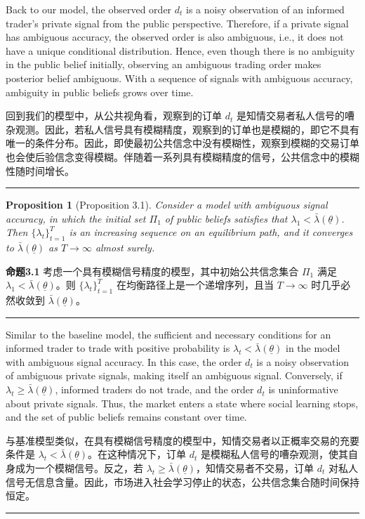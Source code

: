 \documentclass[12pt,a4paper]{article}
\newenvironment{original}{%
  \par\vspace{4pt}\noindent%
  \color{black}%
  \ignorespaces
}{%
  \par\vspace{2pt}%
}
\newenvironment{translation}{%
  \par\vspace{2pt}\noindent%
  \color{transblue}%
  \ignorespaces
}{%
  \par\vspace{4pt}\hrule\vspace{6pt}%
}
\newtheorem{proposition}[theorem]{Proposition}
\begin{document}
\begin{original}
Back to our model, the observed order $d_t$ is a noisy observation of an informed trader's private signal from the public perspective. Therefore, if a private signal has ambiguous accuracy, the observed order is also ambiguous, i.e., it does not have a unique conditional distribution. Hence, even though there is no ambiguity in the public belief initially, observing an ambiguous trading order makes posterior belief ambiguous. With a sequence of signals with ambiguous accuracy, ambiguity in public beliefs grows over time.
\end{original}
\begin{translation}
回到我们的模型中，从公共视角看，观察到的订单 $d_t$ 是知情交易者私人信号的嘈杂观测。因此，若私人信号具有模糊精度，观察到的订单也是模糊的，即它不具有唯一的条件分布。因此，即使最初公共信念中没有模糊性，观察到模糊的交易订单也会使后验信念变得模糊。伴随着一系列具有模糊精度的信号，公共信念中的模糊性随时间增长。
\end{translation}

\begin{proposition}[Proposition 3.1]
Consider a model with ambiguous signal accuracy, in which the initial set $\Pi_1$ of public beliefs satisfies that $\lambda_1 < \bar{\lambda}(\underline{\theta})$. Then $\{\lambda_t\}_{t=1}^T$ is an increasing sequence on an equilibrium path, and it converges to $\bar{\lambda}(\underline{\theta})$ as $T \to \infty$ almost surely.
\end{proposition}
\begin{translation}
\textbf{命题3.1} 考虑一个具有模糊信号精度的模型，其中初始公共信念集合 $\Pi_1$ 满足 $\lambda_1 < \bar{\lambda}(\underline{\theta})$。则 $\{\lambda_t\}_{t=1}^T$ 在均衡路径上是一个递增序列，且当 $T \to \infty$ 时几乎必然收敛到 $\bar{\lambda}(\underline{\theta})$。
\end{translation}

\begin{original}
Similar to the baseline model, the sufficient and necessary conditions for an informed trader to trade with positive probability is $\lambda_t < \bar{\lambda}(\underline{\theta})$ in the model with ambiguous signal accuracy. In this case, the order $d_t$ is a noisy observation of ambiguous private signals, making itself an ambiguous signal. Conversely, if $\lambda_t \geq \bar{\lambda}(\underline{\theta})$, informed traders do not trade, and the order $d_t$ is uninformative about private signals. Thus, the market enters a state where social learning stops, and the set of public beliefs remains constant over time.
\end{original}
\begin{translation}
与基准模型类似，在具有模糊信号精度的模型中，知情交易者以正概率交易的充要条件是 $\lambda_t < \bar{\lambda}(\underline{\theta})$。在这种情况下，订单 $d_t$ 是模糊私人信号的嘈杂观测，使其自身成为一个模糊信号。反之，若 $\lambda_t \geq \bar{\lambda}(\underline{\theta})$，知情交易者不交易，订单 $d_t$ 对私人信号无信息含量。因此，市场进入社会学习停止的状态，公共信念集合随时间保持恒定。
\end{translation}
\end{document}
